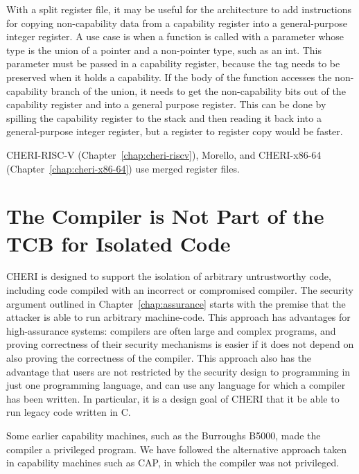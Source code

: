 With a split register file, it may be useful for the architecture to add
instructions for copying non-capability data from a capability register
into a general-purpose integer register. A use case is when a function is called
with a parameter whose type is the union of a pointer and a non-pointer type,
such as an int. This parameter must be passed in a capability register, because
the tag needs to be preserved when it holds a capability. If the body of
the function accesses the non-capability branch of the union, it needs to
get the non-capability bits out of the capability register and into a general
purpose register. This can be done by spilling the capability register to the
stack and then reading it back into a general-purpose integer register, but a register
to register copy would be faster.

CHERI-RISC-V (Chapter~\ref{chap:cheri-riscv}),
Morello, and CHERI-x86-64 (Chapter~\ref{chap:cheri-x86-64}) use merged register files.

\section{The Compiler is Not Part of the TCB for Isolated Code}

CHERI is designed to support the isolation of arbitrary untrustworthy code,
including code compiled with an incorrect or compromised compiler.
The security argument outlined in
Chapter~\ref{chap:assurance} starts with the premise that the attacker is able to
run arbitrary machine-code. This approach has advantages for high-assurance systems:
compilers are often large and complex programs, and proving correctness of their
security mechanisms is easier if it does not depend on also proving the correctness
of the compiler. This approach also has the advantage that users are not restricted
by the security design to programming in just one programming language, and can use
any language for which a compiler has been written. In particular, it is a design
goal of CHERI that it be able to run legacy code written in C.

Some earlier capability machines, such as the Burroughs B5000, made the compiler
a privileged program. We have followed the alternative approach taken in capability machines
such as CAP, in which the compiler was not privileged.


